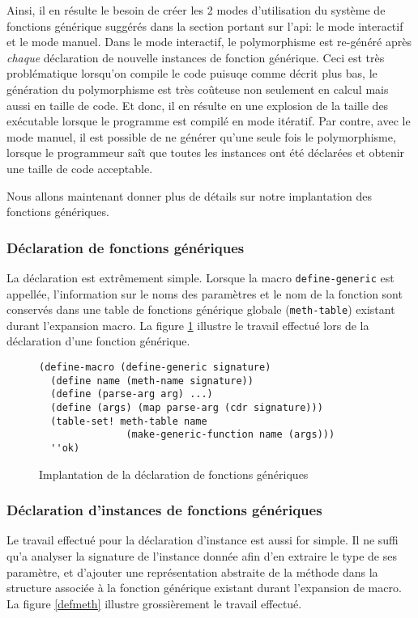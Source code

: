     Ainsi, il en résulte le besoin de créer les 2 modes d'utilisation
    du système de fonctions générique suggérés dans la section portant
    sur l'api: le mode interactif et le mode manuel. Dans le mode
    interactif, le polymorphisme est re-généré après \emph{chaque}
    déclaration de nouvelle instances de fonction générique. Ceci est
    très problématique lorsqu'on compile le code puisuqe comme décrit
    plus bas, le génération du polymorphisme est très coûteuse non
    seulement en calcul mais aussi en taille de code. Et donc, il en
    résulte en une explosion de la taille des exécutable lorsque le
    programme est compilé en mode itératif. Par contre, avec le mode
    manuel, il est possible de ne générer qu'une seule fois le
    polymorphisme, lorsque le programmeur saît que toutes les
    instances ont été déclarées et obtenir une taille de code
    acceptable.

    Nous allons maintenant donner plus de détails sur notre
    implantation des fonctions génériques.

    \subsubsection{Déclaration de fonctions génériques}
      La déclaration est extrêmement simple. Lorsque la macro
      \texttt{define-generic} est appellée, l'information sur le noms
      des paramètres et le nom de la fonction sont conservés dans une
      table de fonctions générique globale (\texttt{meth-table})
      existant durant l'expansion macro. La figure \ref{defgen}
      illustre le travail effectué lors de la déclaration d'une
      fonction générique.

      \begin{figure}[h!]
        \begin{lstlisting}
(define-macro (define-generic signature)
  (define name (meth-name signature))
  (define (parse-arg arg) ...)
  (define (args) (map parse-arg (cdr signature)))
  (table-set! meth-table name 
               (make-generic-function name (args)))
  ''ok)
        \end{lstlisting}
        \caption{Implantation de la déclaration de fonctions
          génériques}
        \label{defgen}
      \end{figure}
    
    \subsubsection{Déclaration d'instances de fonctions génériques}
      Le travail effectué pour la déclaration d'instance est aussi for
      simple. Il ne suffi qu'a analyser la signature de l'instance
      donnée afin d'en extraire le type de ses paramètre, et d'ajouter
      une représentation abstraite de la méthode dans la structure
      associée à la fonction générique existant durant l'expansion de
      macro. La figure \ref{defmeth} illustre grossièrement le travail
      effectué.


